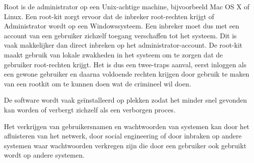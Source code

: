 Root is de administrator op een Unix-achtige machine, bijvoorbeeld Mac OS X of Linux. Een root-kit zorgt ervoor dat de inbreker root-rechten krijgt of Administrator wordt op een Windowssysteem. Een inbreker moet dus met een account van een gebruiker zichzelf toegang verschaffen tot het systeem. Dit is vaak makkelijker dan direct inbreken op het administrator-account. De root-kit maakt gebruik van lokale zwakheden in het systeem om te zorgen dat de gebruiker root-rechten krijgt. Het is dus een twee-traps aanval, eerst inloggen als een gewone gebruiker en daarna voldoende rechten krijgen door gebruik te maken van een rootkit om te kunnen doen wat de crimineel wil doen.

De software wordt vaak ge\"installeerd op plekken zodat het minder snel gevonden kan worden of verbergt zichzelf als een verborgen proces.

Het verkrijgen van gebruikersnamen en wachtwoorden van systemen kan door het afluisteren van het netwerk, door social engineering of door inbraken op andere systemen waar wachtwoorden verkregen zijn die door een gebruiker ook gebruikt wordt op andere systemen.

